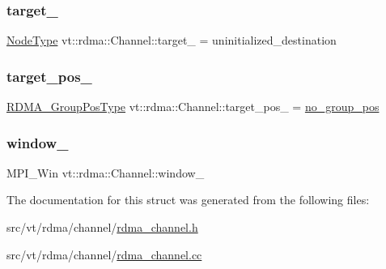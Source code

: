 \mbox{\label{structvt_1_1rdma_1_1_channel_a50932f1ef290b73c7d3010e5e5cd24f7}} 
\subsubsection{\texorpdfstring{target\+\_\+}{target\_}}
{\footnotesize\ttfamily \hyperlink{namespacevt_a866da9d0efc19c0a1ce79e9e492f47e2}{Node\+Type} vt\+::rdma\+::\+Channel\+::target\+\_\+ = uninitialized\+\_\+destination\hspace{0.3cm}{\ttfamily [private]}}

\mbox{\label{structvt_1_1rdma_1_1_channel_a2d500c08cfff04453e181002f1d16cad}} 
\subsubsection{\texorpdfstring{target\+\_\+pos\+\_\+}{target\_pos\_}}
{\footnotesize\ttfamily \hyperlink{structvt_1_1rdma_1_1_channel_ae67759ab26cc035489edd369ae207cfc}{R\+D\+M\+A\+\_\+\+Group\+Pos\+Type} vt\+::rdma\+::\+Channel\+::target\+\_\+pos\+\_\+ = \hyperlink{structvt_1_1rdma_1_1_channel_a5b8e4d79d272951f51a9856705110d24}{no\+\_\+group\+\_\+pos}\hspace{0.3cm}{\ttfamily [private]}}

\mbox{\label{structvt_1_1rdma_1_1_channel_aaecfddf4b74d52f4924d228ec46bcf59}} 
\subsubsection{\texorpdfstring{window\+\_\+}{window\_}}
{\footnotesize\ttfamily M\+P\+I\+\_\+\+Win vt\+::rdma\+::\+Channel\+::window\+\_\+\hspace{0.3cm}{\ttfamily [private]}}



The documentation for this struct was generated from the following files\+:\begin{DoxyCompactItemize}
\item 
src/vt/rdma/channel/\hyperlink{rdma__channel_8h}{rdma\+\_\+channel.\+h}\item 
src/vt/rdma/channel/\hyperlink{rdma__channel_8cc}{rdma\+\_\+channel.\+cc}\end{DoxyCompactItemize}
